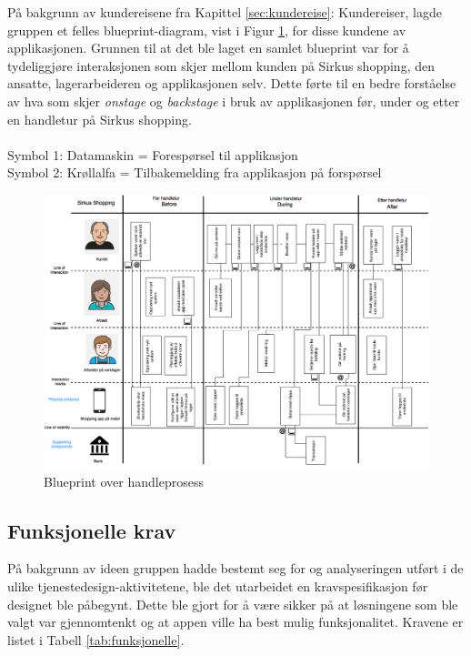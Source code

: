 \noindent På bakgrunn av kundereisene fra Kapittel \ref{sec:kundereise}: Kundereiser, lagde gruppen et felles blueprint-diagram, vist i Figur \ref{fig:blueprint}, for disse kundene av applikasjonen. Grunnen til at det ble laget en samlet blueprint var for å tydeliggjøre interaksjonen som skjer mellom kunden på Sirkus shopping, den ansatte, lagerarbeideren og applikasjonen selv. Dette førte til en bedre forståelse av hva som skjer \textit{onstage} og \textit{backstage} i bruk av applikasjonen før, under og etter en handletur på Sirkus shopping. 
\\\\
Symbol 1: Datamaskin = Forespørsel til applikasjon\\
Symbol 2: Krøllalfa = Tilbakemelding fra applikasjon på forspørsel

\begin{figure}[H]
\includegraphics[scale=0.375]{images/customerjourneyBlueprint/blueprint5png}
\caption{Blueprint over handleprosess}
\label{fig:blueprint}
\end{figure}

\subsection{Funksjonelle krav}
\label{funkkrav}
På bakgrunn av ideen gruppen hadde bestemt seg for og analyseringen utført i de ulike tjenestedesign-aktivitetene, ble det utarbeidet en kravspesifikasjon før designet ble påbegynt. Dette ble gjort for å være sikker på at løsningene som ble valgt var gjennomtenkt og at appen ville ha best mulig funksjonalitet. Kravene er listet i Tabell \ref{tab:funksjonelle}.

